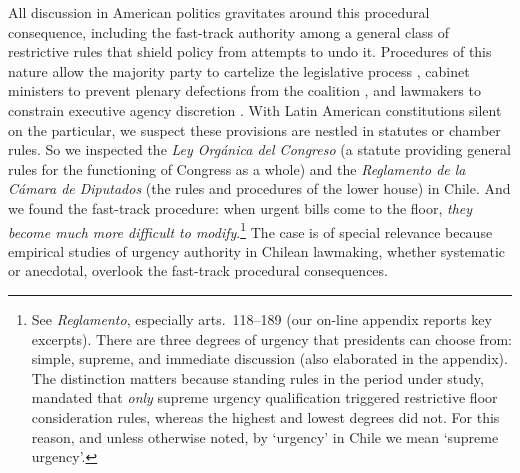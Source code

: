 \documentclass[letter,12pt]{article}
\begin{document}
All discussion in American politics gravitates around this procedural consequence, including the fast-track authority among a general class of restrictive rules that shield policy from attempts to undo it. Procedures of this nature allow the majority party to cartelize the legislative process \citep{cox.mccubbins.1993}, cabinet ministers to prevent plenary defections from the coalition \citep{heller.2001}, and lawmakers to constrain executive agency discretion \citep{mcnollgast.1987}. With Latin American constitutions silent on the particular, we suspect these provisions are nestled in statutes or chamber rules. So we inspected the \emph{Ley Orgánica del Congreso} (a statute providing general rules for the functioning of Congress as a whole) and the \emph{Reglamento de la Cámara de Diputados} (the rules and procedures of the lower house) in Chile. And we found the fast-track procedure: when urgent bills come to the floor, \emph{they become much more difficult to modify}.\footnote{See \emph{Reglamento}, especially arts.\ 118--189 (our on-line appendix reports key excerpts). There are three degrees of urgency that presidents can choose from: simple, supreme, and immediate discussion (also elaborated in the appendix). The distinction matters because standing rules in the period under study, mandated that \emph{only} supreme urgency qualification triggered restrictive floor consideration rules, whereas the highest and lowest degrees did not. For this reason, and unless otherwise noted, by `urgency' in Chile we mean `supreme urgency'.}\label{fn:supreme} The case is of special relevance because empirical studies of urgency authority in Chilean lawmaking, whether systematic or anecdotal, overlook the fast-track procedural consequences.
\end{document}
